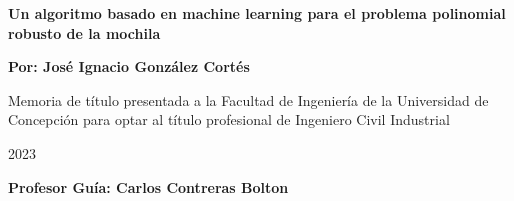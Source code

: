 \documentclass[spanish, a4paper, 12pt, openany,final]{book}
\begin{document}
\def\biblio{}   %

\begin{titlepage}
	
	
	\thispagestyle{frontpage}
	
	\begin{center}
		
		\vspace*{4\baselineskip}
		
		
		{\Huge \textbf{Un algoritmo basado en machine learning para el problema polinomial robusto de la mochila\\}}
		\vspace*{1.5\baselineskip}
		
		
		\vspace*{1,5\baselineskip}
		
		\large{\textbf{Por: José Ignacio González Cortés}}\\
		
		\vspace{1,5\baselineskip}
		
		\large{Memoria de título presentada a la Facultad de Ingeniería de la Universidad de Concepción para optar al título profesional de Ingeniero Civil Industrial} 
		
		\vspace{1,5\baselineskip}
		\DTMspanishMonthname{\month} 2023  \\
		\vspace{1,5\baselineskip}
		
		\large{\textbf{Profesor Guía: Carlos Contreras Bolton}}\\
		
	\end{center}
	
	\vspace*{4\baselineskip}
	
\end{titlepage}


\vfill

\end{document}
